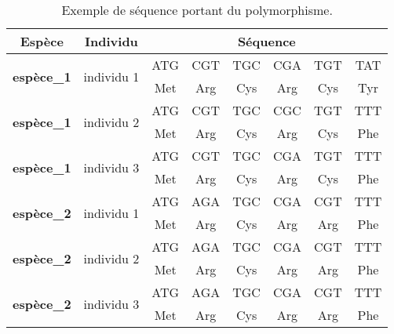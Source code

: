 \documentclass[../main]{subfiles} %
\begin{document}



\begin{table}[]
    \centering
    \scriptsize
    \begin{tabular}{cccccccc}
        \toprule
        \textbf{Espèce}                     & \textbf{Individu}             & \multicolumn{6}{c}{\textbf{Séquence}} \\
        \midrule
        \multirow{2}{*}{\textbf{espèce\_1}} & \multirow{2}{*}{individu 1}   & ATG  & CGT  & TGC  & CGA  & TGT & TAT \\
                                            &                               & Met  & Arg  & Cys  & Arg  & Cys  & Tyr \\
        \midrule
        \multirow{2}{*}{\textbf{espèce\_1}} & \multirow{2}{*}{individu 2}   & ATG  & CGT  & TGC  & CGC  & TGT & TTT \\
                                            &                               & Met  & Arg  & Cys  & Arg  & Cys  & Phe \\
        \midrule
        \multirow{2}{*}{\textbf{espèce\_1
        }} & \multirow{2}{*}{individu 3}   & ATG  & CGT  & TGC  & CGA  & TGT & TTT \\
                                            &                               & Met  & Arg  & Cys  & Arg  & Cys  & Phe \\
        \midrule
        \multirow{2}{*}{\textbf{espèce\_2}} & \multirow{2}{*}{individu 1} & ATG  & AGA  & TGC  & CGA  & CGT & TTT \\
                                            &                               & Met  & Arg  & Cys  & Arg  & Arg  & Phe   \\
        \midrule
        \multirow{2}{*}{\textbf{espèce\_2}} & \multirow{2}{*}{individu 2}   & ATG  & AGA & TGC  & CGA  & CGT & TTT \\
                                            &                               & Met  & Arg  & Cys  & Arg  & Arg  & Phe   \\
        \midrule
        \multirow{2}{*}{\textbf{espèce\_2}} & \multirow{2}{*}{individu 3}   & ATG  & AGA  & TGC  & CGA  & CGT & TTT \\
                                            &                               & Met  & Arg  & Cys  & Arg  & Arg  & Phe   \\
        \bottomrule
    \end{tabular}
    \scriptsize \caption{Exemple de séquence portant du polymorphisme.}
    \label{tab:seqEx}
\end{table}
\end{document}
